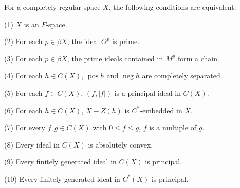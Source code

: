 For a completely regular space $X$, the following conditions are equivalent:

(1) $X$ is an $F$-space.

(2) For each $p \in \beta X$, the ideal $O^p$ is prime.

(3) For each $p \in \beta X$, the prime ideals contained in $M^p$ form a chain.

(4) For each $h \in C(X)$, $\operatorname{pos} h$ and $\operatorname{neg} h$ are completely separated.

(5) For each $f \in C(X)$, $(f, |f|)$ is a principal ideal in $C(X)$.

(6) For each $h \in C(X)$, $X - Z(h)$ is $C^*$-embedded in $X$.

(7) For every $f, g \in C(X)$ with $0 \leq f \leq g$, $f$ is a multiple of $g$.

(8) Every ideal in $C(X)$ is absolutely convex.

(9) Every finitely generated ideal in $C(X)$ is principal.

(10) Every finitely generated ideal in $C^*(X)$ is principal.
